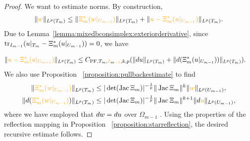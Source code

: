 \documentclass[10pt,letterpaper]{article}
\newcommand\cye[1]{%
  \protect\leavevmode
  \begingroup
    \color{red!35!yellow}%
    #1%
  \endgroup
}
\begin{document}
\begin{proof}
    We want to estimate norms. 
    By construction,
    \begin{align*}
        \| \cye{w} \|_{L^{p}(T_{m})}
        \leq  
        \| \cye{\Xi_{m}^{\ast}(w|_{U_{m-1}})} \|_{L^{p}(T_{m})}
        + 
        \| \cye{u - \Xi_{m}^{\ast}(u|_{U_{m-1}})} \|_{L^{p}(T_{m})}
        .
    \end{align*}
    Due to Lemma~\ref{lemma:mixedbconsimplex:exteriorderivative}, \cye{since $\operatorname{tr}_{I_{m-1}} (u|_{T_m} - \Xi_{m}^{\ast}(u|_{U_{m-1}})) = 0$, we have}
    \begin{align*}
        \| \cye{u - \Xi_{m}^{\ast}(u|_{U_{m-1}})} \|_{L^{p}(T_{m})} 
        &
        \leq 
        C_{\PF,T_{m},\cye{I}_{m\cye{-1}},k,p} (\| \cartan u      \|_{L^{p}(T_{m})} 
        + \| \cartan (\Xi_{m}^{\ast}(u|_{U_{m-1}})) \|_{L^{p}(T_{m})} )
        .
    \end{align*}\todo{MV: $\diam(T)^{\cye{k}}$???}
    We also use \cye{Proposition}~\ref{proposition:pullbackestimate} to find 
    \begin{align*}
        \| \cye{\Xi_{m}^{\ast}(w|_{U_{m-1}})} \|_{L^{p}(T_{m})}
        &\leq 
        |\det(\Jacobian \Xi_{m}  )|^{-\frac 1 p} 
        \| \Jacobian \Xi_{m} \|^{k}
        \| \cye{w} \|_{L^{p}(U_{m-1})}
        ,
        \\
        \| \cartan (\cye{\Xi_{m}^{\ast}(w|_{U_{m-1}})}) \|_{L^{p}(T_{m})}
        &\leq 
        |\det(\Jacobian \Xi_{m}  )|^{-\frac 1 p} 
        \| \Jacobian \Xi_{m} \|^{k+1}
        \| \cartan \cye{u} \|_{L^{p}(U_{m-1})}
        ,
    \end{align*}
    \cye{where we have employed} that $d w = d u$ \cye{over $\Omega_{m-1}$}. 
    Using the properties of the reflection mapping in \cye{Proposition}~\ref{proposition:starreflection}, the desired recursive estimate follows. 
\end{proof}
\end{document}
